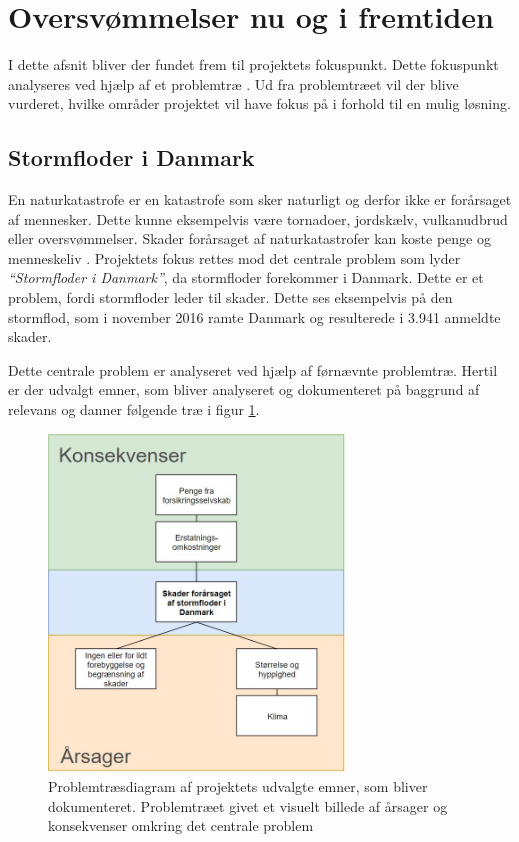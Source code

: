 
\section{Oversvømmelser nu og i fremtiden}\label{sc:oversvoemmelser}
I dette afsnit bliver der fundet frem til projektets fokuspunkt. Dette fokuspunkt analyseres ved hjælp af et problemtræ \cite{3}. Ud fra problemtræet vil der blive vurderet, hvilke områder projektet vil have fokus på i forhold til en mulig løsning.

\subsection{Stormfloder i Danmark}
En naturkatastrofe er en katastrofe som sker naturligt og derfor ikke er forårsaget af mennesker. Dette kunne eksempelvis være tornadoer, jordskælv, vulkanudbrud eller oversvømmelser. Skader forårsaget af naturkatastrofer kan koste penge og menneskeliv \cite{3a}.
Projektets fokus rettes mod det centrale problem som lyder \textit{“Stormfloder i Danmark”}, da stormfloder forekommer i Danmark. Dette er et problem, fordi stormfloder leder til skader. Dette ses eksempelvis på den stormflod, som i november 2016 ramte Danmark og resulterede i 3.941 anmeldte skader\cite{3b}.
\par
Dette centrale problem er analyseret ved hjælp af førnævnte problemtræ. Hertil er der udvalgt emner, som bliver analyseret og dokumenteret på baggrund af relevans og danner følgende træ i figur \ref{Problemtrae}.
\begin{figure}[H]
    \centering
    \includegraphics[width=0.7\textwidth]{figures/problemTrae.JPG}
    \caption{Problemtræsdiagram af projektets udvalgte emner, som bliver dokumenteret. Problemtræet givet et visuelt billede af årsager og konsekvenser omkring det centrale problem}
    \label{Problemtrae}
\end{figure}

